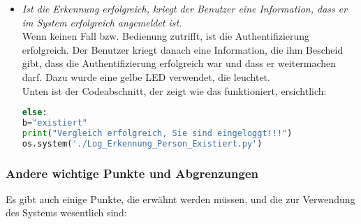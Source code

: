 \begin{enumerate}
\begin{itemize}
\begin{enumerate}
	\end{enumerate}
\item \textit{Ist die Erkennung erfolgreich, kriegt der Benutzer eine Information, dass er im System erfolgreich angemeldet ist.} \\

Wenn keinen Fall bzw. Bedienung zutrifft, ist die Authentifizierung erfolgreich. Der Benutzer kriegt danach eine Information, die ihm Bescheid gibt, dass die Authentifizierung erfolgreich war und dass er weitermachen darf. Dazu wurde eine gelbe LED verwendet, die leuchtet. \\	

Unten ist der Codeabschnitt, der zeigt wie das funktioniert, ersichtlich:\\

\begin{lstlisting}[language=Python]
else:
b="existiert"
print("Vergleich erfolgreich, Sie sind eingeloggt!!!")
os.system('./Log_Erkennung_Person_Existiert.py')
\end{lstlisting}

\end{itemize}
\end{enumerate}
\subsubsection{Andere wichtige Punkte und Abgrenzungen}

Es gibt auch einige Punkte, die erwähnt werden müssen, und die zur Verwendung des Systems wesentlich sind:

